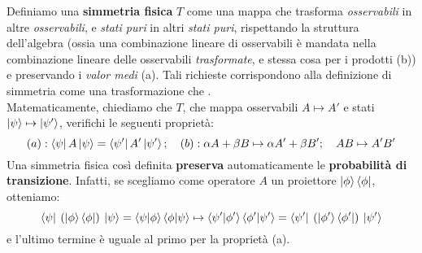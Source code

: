 \documentclass[../../FisicaTeorica.tex]{subfiles}
\begin{document}
\begin{dfn}
Definiamo una \textbf{simmetria fisica} $T$ come una mappa che trasforma \textit{osservabili} in altre \textit{osservabili}, e \textit{stati puri} in altri \textit{stati puri}, rispettando la struttura dell'algebra (ossia una combinazione lineare di osservabili è mandata nella combinazione lineare delle osservabili \textit{trasformate}, e stessa cosa per i prodotti (b)) e preservando i \textit{valor medi} (a). Tali richieste corrispondono alla definizione di simmetria come una trasformazione che .\\
Matematicamente, chiediamo che $T$, che mappa osservabili $A \mapsto A'$ e stati $\ket{\psi}\mapsto \ket{\psi'}$, verifichi le seguenti proprietà:
\[
(a):
\bra{\psi}A\ket{\psi} = \bra{\psi'}A'\ket{\psi'};\quad (b): \alpha A + \beta B \mapsto \alpha A' + \beta B'; \quad AB \mapsto A'B'
\]
Una simmetria fisica così definita \textbf{preserva} automaticamente le \textbf{probabilità di transizione}. Infatti, se scegliamo come operatore $A$ un proiettore $\ket{\phi}\bra{\phi}$, otteniamo:
\[
\bra{\psi}\> (\ket{\phi}\bra{\phi}) \> \ket{\psi} = \braket{\psi|\phi}\braket{\phi|\psi} \mapsto \braket{\psi'|\phi'}\braket{\phi' | \psi'} = \bra{\psi'}\>(\ket{\phi'}\bra{\phi'})\>\ket{\psi'}
\] 
e l'ultimo termine è uguale al primo per la proprietà (a).
\end{dfn} 
\end{document}
